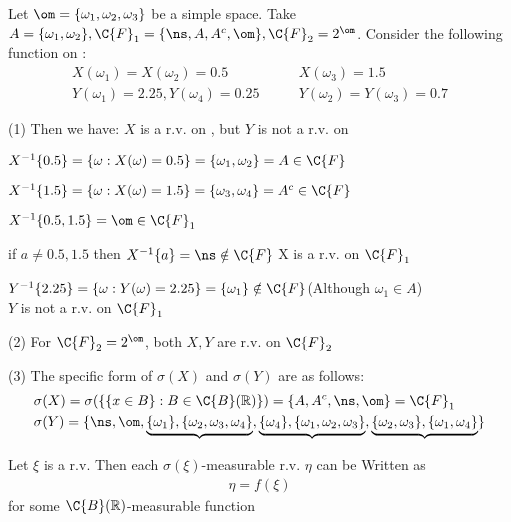 
Let $\om = \{\omega_1,\omega_2, \omega_3\}$ be a simple space.
Take $A = \{\omega_1, \omega_2\}, \C{F}_1 = \{\ns, A, A^c, \om\}, \C{F}_2 = 2^\om$. Consider the 
following function on \om:
\begin{align*}
    X(\omega_1) = X(\omega_2) = 0.5 &\qquad X(\omega_3) = 1.5\\
    Y(\omega_1) = 2.25, Y(\omega_4) = 0.25 &\qquad Y(\omega_2) = Y(\omega_3) = 0.7
\end{align*}

\noindent(1) Then we have: $X$ is a r.v. {\color{red}on }, but $Y$ is not a r.v. {\color{red} on }


$X^{-1}\{0.5\} = \{\omega: X(\omega) = 0.5\} = \{\omega_1,\omega_2\} = A\in \C{F}$

$X^{-1}\{1.5\} = \{\omega: X(\omega) = 1.5\} = \{\omega_3,\omega_4\} = A^c\in\C{F}$

$X^{-1}\{0.5, 1.5\} = \om \in\C{F}_1$

if $a \neq 0.5, 1.5 $ then $X^{-1}\{a\} = \ns\notin \C{F}$
{\color{red} \lrr} X is a r.v. on $\C{F}_1$


$Y^{-1}\{2.25\} = \{\omega: Y(\omega) = 2.25\} = \{\omega_1\} \notin\C{F}$\quad (Although $\omega_1 \in A$)\\
{\color{red} \lrr} $Y$ is not a r.v. on $\C{F}_1$

\noindent(2) For $\C{F}_2 = 2^\om$, both $X, Y$ are r.v. on $\C{F}_2$ 

\noindent(3) The specific form of $\sigma(X)$ and $\sigma(Y)$ are as follows:
\begin{align*}
    & \sigma(X) = \sigma(\{\{x\in B\}:B\in \C{B}(\rr)\}) = \{A, A^c, \ns, \om\} = \C{F}_1   \\ 
    & \sigma(Y) = \{\ns, \om, \underbrace{\{\omega_1\}, \{\omega_2, \omega_3, \omega_4\}}, \underbrace{\{\omega_4\}, \{\omega_1, \omega_2, \omega_3\}}, \underbrace{\{\omega_2,\omega_3\},\{\omega_1, \omega_4\}}\} 
\end{align*}

\begin{lemma}
     Let $\xi$ is a r.v. Then each $\sigma(\xi)$-measurable r.v. $\eta$
    can be Written as 
    \begin{align*}
        \eta = f(\xi)
    \end{align*}
    for some $\C{B}(\rr)$-measurable function 
\end{lemma}

